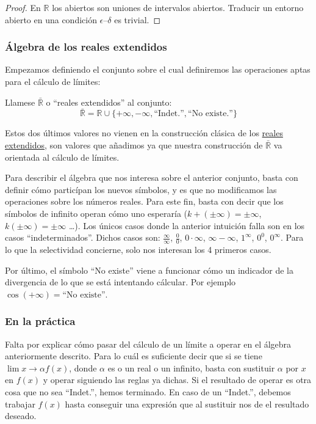 \documentclass[10pt]{article}
\newcommand{\R}{\mathbb{R}}
\begin{document}
\begin{proof}
  En $\R$ los abiertos son uniones de intervalos abiertos. Traducir un entorno abierto en una condición $\epsilon$--$\delta$ es trivial.
\end{proof}


\subsubsection{Álgebra de los reales extendidos}

Empezamos definiendo el conjunto sobre el cual definiremos las operaciones aptas para el cálculo de límites:

\begin{definition}
  Llamese $ \bar{\R} $ o ``reales extendidos'' al conjunto:
  \[ \bar{\R} = \R \cup \{+\infty, -\infty, \text{``Indet.''}, \text{``No existe.''}\} \]
\end{definition}

Estos dos últimos valores no vienen en la construcción clásica de los \href{https://ncatlab.org/nlab/show/extended+real+numbers}{reales extendidos}, son valores que añadimos
ya que nuestra construcción de $ \bar{\R} $ va orientada al cálculo de límites.

Para describir el álgebra que nos interesa sobre el anterior conjunto, basta con definir cómo particípan los nuevos símbolos, y es que no modificamos las operaciones sobre
los números reales. Para este fin, basta con decir que los símbolos de infinito operan cómo uno esperaría ($ k + (\pm \infty) = \pm \infty $, $ k(\pm\infty) = \pm \infty $ \dots).
Los únicos casos donde la anterior intuición falla son en los casos ``indeterminados''. Dichos casos son: $ \frac{\infty}{\infty} $, $ \frac{0}{0} $, $ 0 \cdot \infty $, $ \infty - \infty $, 
$ 1^\infty $, $ 0^0 $, $ 0^\infty $. Para lo que la selectividad concierne, solo nos interesan los 4 primeros casos.

Por último, el símbolo ``No existe'' viene a funcionar cómo un indicador de la divergencia de lo que se está intentando cálcular. Por ejemplo $ \cos(+\infty) = \text{``No existe''} $.


\subsubsection{En la práctica}

Falta por explicar cómo pasar del cálculo de un límite a operar en el álgebra anteriormente descrito. Para lo cuál es suficiente decir que si se tiene $ \lim{x \to \alpha} f(x) $,
donde $ \alpha $ es o un real o un infinito, basta con sustituir $ \alpha $ por $ x $ en $ f(x) $ y operar siguiendo las reglas ya dichas. Si el resultado de operar es otra cosa
que no sea ``Indet.'', hemos terminado. En caso de un ``Indet.'', debemos trabajar $ f(x) $ hasta conseguir una expresión que al sustituir nos de el resultado deseado.
\end{document}
